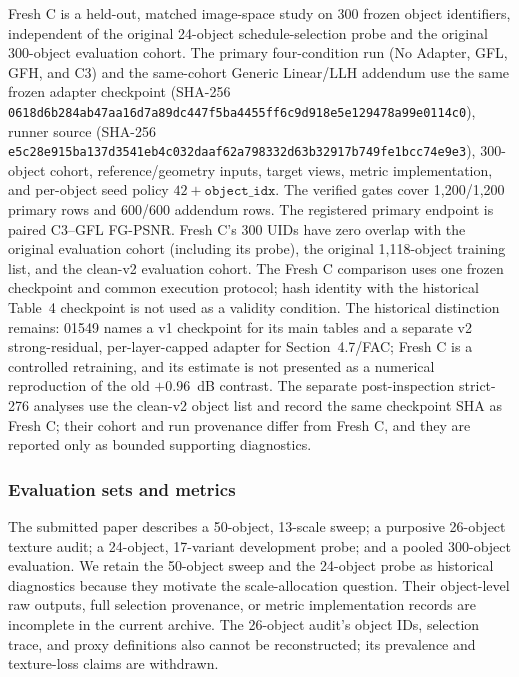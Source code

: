 \documentclass[times,twocolumn,final]{elsarticle}
\begin{document}
Fresh C is a held-out, matched image-space study on 300 frozen object identifiers, independent of the original 24-object schedule-selection probe and the original 300-object evaluation cohort. The primary four-condition run (No Adapter, GFL, GFH, and C3) and the same-cohort Generic Linear/LLH addendum use the same frozen adapter checkpoint (SHA-256 \texttt{0618d6b2\allowbreak{}84ab47aa\allowbreak{}16d7a89d\allowbreak{}c447f5ba\allowbreak{}4455ff6c\allowbreak{}9d918e5e\allowbreak{}129478a9\allowbreak{}9e0114c0}), runner source (SHA-256 \texttt{e5c28e91\allowbreak{}5ba137d3\allowbreak{}541eb4c0\allowbreak{}32daaf62\allowbreak{}a798332d\allowbreak{}63b32917\allowbreak{}b749fe1b\allowbreak{}cc74e9e3}), 300-object cohort, reference/geometry inputs, target views, metric implementation, and per-object seed policy $42+\texttt{object\_idx}$. The verified gates cover 1,200/1,200 primary rows and 600/600 addendum rows. The registered primary endpoint is paired C3--GFL FG-PSNR. Fresh C's 300 UIDs have zero overlap with the original evaluation cohort (including its probe), the original 1,118-object training list, and the clean-v2 evaluation cohort. The Fresh C comparison uses one frozen checkpoint and common execution protocol; hash identity with the historical Table~4 checkpoint is not used as a validity condition. The historical distinction remains: 01549 names a v1 checkpoint for its main tables and a separate v2 strong-residual, per-layer-capped adapter for Section~4.7/FAC; Fresh C is a controlled retraining, and its estimate is not presented as a numerical reproduction of the old $+0.96$~dB contrast. The separate post-inspection strict-276 analyses use the clean-v2 object list and record the same checkpoint SHA as Fresh C; their cohort and run provenance differ from Fresh C, and they are reported only as bounded supporting diagnostics.

\subsubsection{Evaluation sets and metrics}

The submitted paper describes a 50-object, 13-scale sweep; a purposive 26-object texture audit; a 24-object, 17-variant development probe; and a pooled 300-object evaluation. We retain the 50-object sweep and the 24-object probe as historical diagnostics because they motivate the scale-allocation question. Their object-level raw outputs, full selection provenance, or metric implementation records are incomplete in the current archive. The 26-object audit's object IDs, selection trace, and proxy definitions also cannot be reconstructed; its prevalence and texture-loss claims are withdrawn.
\end{document}

